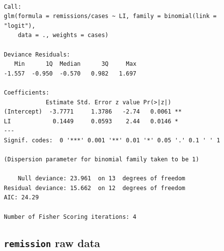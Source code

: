 \documentclass[]{book}
\begin{document}
\begin{verbatim}

Call:
glm(formula = remissions/cases ~ LI, family = binomial(link = "logit"), 
    data = ., weights = cases)

Deviance Residuals: 
   Min      1Q  Median      3Q     Max  
-1.557  -0.950  -0.570   0.982   1.697  

Coefficients:
            Estimate Std. Error z value Pr(>|z|)   
(Intercept)  -3.7771     1.3786   -2.74   0.0061 **
LI            0.1449     0.0593    2.44   0.0146 * 
---
Signif. codes:  0 '***' 0.001 '**' 0.01 '*' 0.05 '.' 0.1 ' ' 1

(Dispersion parameter for binomial family taken to be 1)

    Null deviance: 23.961  on 13  degrees of freedom
Residual deviance: 15.662  on 12  degrees of freedom
AIC: 24.29

Number of Fisher Scoring iterations: 4
\end{verbatim}

\hypertarget{remission-raw-data}{%
\subsection{\texorpdfstring{\texttt{remission} raw data}{remission raw data}}\label{remission-raw-data}}
\end{document}
